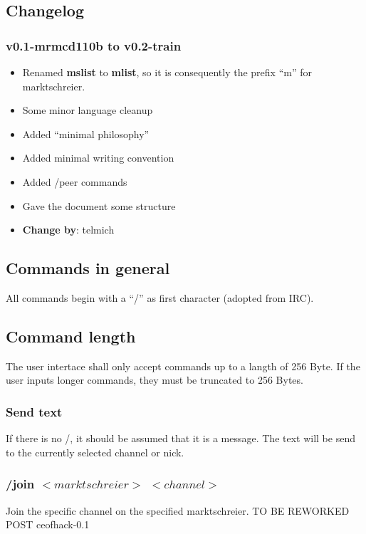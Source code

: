 \documentclass[12pt,a4paper]{book}
\begin{document}
\subsection{Changelog}
\subsubsection{v0.1-mrmcd110b to v0.2-train}
   \begin{itemize}
      \item Renamed \textbf{mslist} to \textbf{mlist}, so it is consequently the prefix
      "`m"' for marktschreier.
      \item Some minor language cleanup 
      \item Added "`minimal philosophy"'
      \item Added minimal writing convention
      \item Added /peer commands
      \item Gave the document some structure
      \item \textbf{Change by}: telmich
   \end{itemize}

\subsection{Commands in general}
All commands begin with a "`/"' as first character (adopted from IRC).
\subsection{Command length}
The user intertace shall only accept commands up to a langth of 256 Byte.
If the user inputs longer commands, they must be truncated
to 256 Bytes.
\subsubsection{Send text}
If there is no /, it should be assumed that it is a message.
The text will be send to the currently selected channel or nick.

\subsubsection{/join $<marktschreier>$ $<channel>$}
Join the specific channel on the specified marktschreier.
TO BE REWORKED
POST ceofhack-0.1
\end{document}
